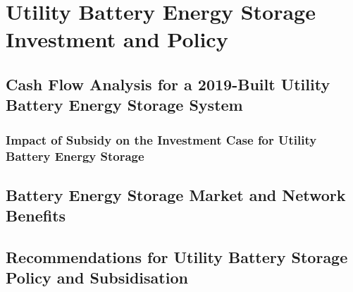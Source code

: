 \chapter{ Utility Battery Energy Storage Investment and Policy }
\section{ Cash Flow Analysis for a 2019-Built Utility Battery Energy Storage System }
\subsection{ Impact of Subsidy on the Investment Case for Utility Battery Energy Storage }
\section{ Battery Energy Storage Market and Network Benefits }
\section{ Recommendations for Utility Battery Storage Policy and 
Subsidisation}